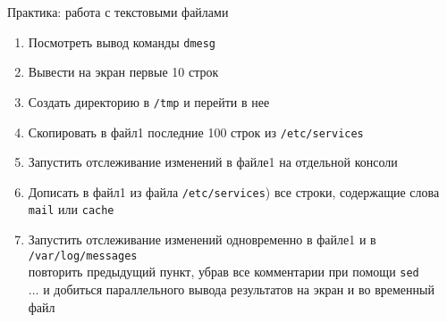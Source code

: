 \begin{frame}[fragile]{Практика: работа с текстовыми файлами}
  \begin{enumerate}
	  \item Посмотреть вывод команды {\tt dmesg}
	  \item Вывести на экран первые 10 строк 
		  \pause
	  \item Создать директорию в {\tt /tmp} и перейти в нее
	  \item Скопировать в файл1 последние 100 строк из {\tt /etc/services}
	  \item Запустить отслеживание изменений в файле1 на отдельной консоли
	  \item Дописать в файл1 из файла {\tt /etc/services}) все строки,
		  содержащие слова {\tt mail} или {\tt cache}
		  \pause
	  \item Запустить отслеживание изменений одновременно в файле1 и в {\tt /var/log/messages}\\
		  \pause
			повторить предыдущий пункт, убрав все комментарии при помощи {\tt sed}\\
		  \pause
		  ... и добиться параллельного вывода результатов на экран и во временный файл
  \end{enumerate}
\end{frame}
